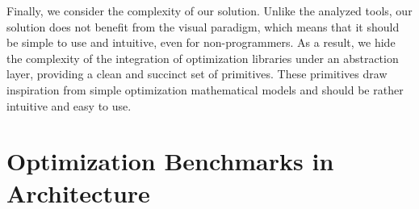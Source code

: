 Finally, we consider the complexity of our solution. Unlike the analyzed tools, our solution does not benefit from the visual paradigm, which means that it should be simple to use and intuitive, even for non-programmers. As a result, we hide the complexity of the integration of optimization libraries under an abstraction layer, providing a clean and succinct set of primitives. These primitives draw inspiration from simple optimization mathematical models and should be rather intuitive and easy to use. 



\section{Optimization Benchmarks in Architecture}



